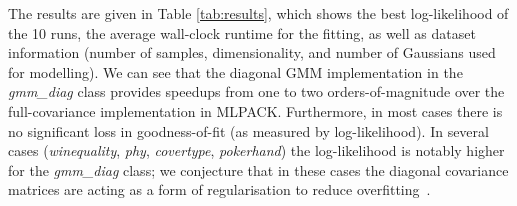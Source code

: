 The results are given in Table \ref{tab:results}, which shows the best log-likelihood of the 10 runs,
the average wall-clock runtime for the fitting,
as well as dataset information
(number of samples, dimensionality, and number of Gaussians used for modelling).
We can see that the diagonal GMM implementation in 
the {\it gmm\_diag} class provides speedups from one to two orders-of-magnitude
over the full-covariance implementation in \mbox{MLPACK}.
Furthermore, in most cases there is no significant loss in goodness-of-fit (as measured by log-likelihood).
In several cases ({\it winequality}, {\it phy}, {\it covertype}, {\it pokerhand})
the log-likelihood is notably higher for the {\it gmm\_diag} class;
we conjecture that in these cases the diagonal covariance matrices are acting as a form of regularisation to reduce overfitting~\cite{Bishop_2006}.


